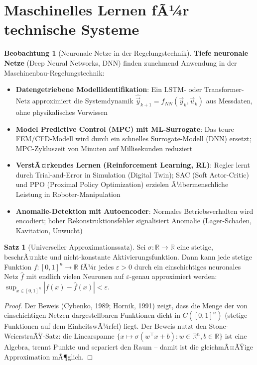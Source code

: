 ﻿\documentclass[a4paper,12pt]{report}
\theoremstyle{definition}
\newtheorem{satz}{Satz}
\newtheorem{beobachtung}{Beobachtung}
\begin{document}
\section{Maschinelles Lernen fÃ¼r technische Systeme}

\begin{beobachtung}[Neuronale Netze in der Regelungstechnik]
\textbf{Tiefe neuronale Netze} (Deep Neural Networks, DNN) finden
zunehmend Anwendung in der Maschinenbau-Regelungstechnik:
\begin{itemize}
    \item[-] \textbf{Datengetriebene Modellidentifikation}: Ein LSTM- oder
          Transformer-Netz approximiert die Systemdynamik $\hat{\vec{y}}_{k+1} = f_{NN}(\vec{y}_k, \vec{u}_k)$
          aus Messdaten, ohne physikalisches Vorwissen
    \item[-] \textbf{Model Predictive Control (MPC) mit ML-Surrogate}:
          Das teure FEM/CFD-Modell wird durch ein schnelles Surrogate-Modell (DNN)
          ersetzt; MPC-Zykluszeit von Minuten auf Millisekunden reduziert
    \item[-] \textbf{VerstÃ¤rkendes Lernen (Reinforcement Learning, RL)}:
          Regler lernt durch Trial-and-Error in Simulation (Digital Twin);
          SAC (Soft Actor-Critic) und PPO (Proximal Policy Optimization)
          erzielen Ã¼bermenschliche Leistung in Roboter-Manipulation
    \item[-] \textbf{Anomalie-Detektion mit Autoencoder}:
          Normales Betriebsverhalten wird encodiert; hoher Rekonstruktionsfehler
          signalisiert Anomalie (Lager-Schaden, Kavitation, Unwucht)
\end{itemize}
\end{beobachtung}

\begin{satz}[Universeller Approximationssatz]
Sei $\sigma: \mathbb{R} \to \mathbb{R}$ eine stetige, beschrÃ¤nkte und
nicht-konstante Aktivierungsfunktion. Dann kann jede stetige Funktion
$f: [0,1]^n \to \mathbb{R}$ fÃ¼r jedes $\varepsilon > 0$ durch ein
einschichtiges neuronales Netz $\hat{f}$ mit endlich vielen Neuronen
auf $\varepsilon$-genau approximiert werden:
$\sup_{x\in[0,1]^n}|f(x) - \hat{f}(x)| < \varepsilon$.
\end{satz}
\begin{proof}
Der Beweis (Cybenko, 1989; Hornik, 1991) zeigt, dass die Menge der
von einschichtigen Netzen dargestellbaren Funktionen dicht in
$C([0,1]^n)$ (stetige Funktionen auf dem EinheitswÃ¼rfel) liegt.
Der Beweis nutzt den Stone-WeierstraÃŸ-Satz: die Linearspanne
$\{x\mapsto\sigma(w^\top x + b) : w\in\mathbb{R}^n, b\in\mathbb{R}\}$
ist eine Algebra, trennt Punkte und separiert den Raum -- damit
ist die gleichmÃ¤ÃŸige Approximation mÃ¶glich.
\end{proof}
\end{document}
